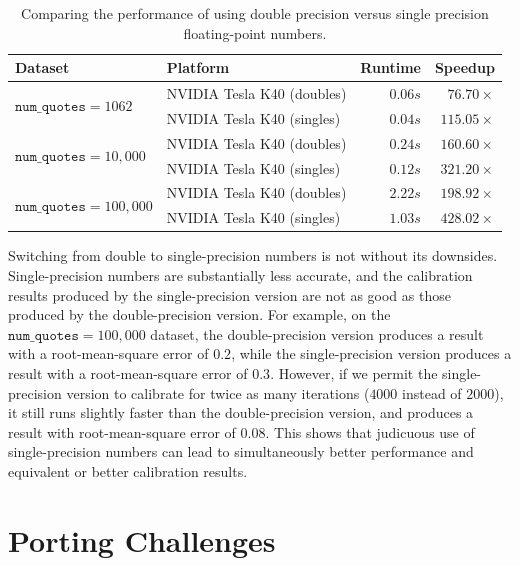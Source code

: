 \documentclass{article}
\begin{document}
\begin{table}
  \centering
\begin{tabular}{l|l|r|r}
  \textbf{Dataset} & \textbf{Platform} & \textbf{Runtime} & \textbf{Speedup} \\\hline\hline

  \multirow{2}{*}{$\texttt{num\_quotes}=1062$} & NVIDIA Tesla K40 (doubles) & $0.06s$ & $76.70\times$ \\
  & NVIDIA Tesla K40 (singles) & $0.04s$ & $115.05\times$ \\\hline

  \multirow{2}{*}{$\texttt{num\_quotes}=10,000$} & NVIDIA Tesla K40 (doubles) & $0.24s$ & $160.60\times$  \\
  & NVIDIA Tesla K40 (singles) & $0.12s$ & $321.20\times$ \\\hline

  \multirow{2}{*}{$\texttt{num\_quotes}=100,000$} & NVIDIA Tesla K40 (doubles) & $2.22s$ & $198.92\times$ \\
  & NVIDIA Tesla K40 (singles) & $1.03s$ & $428.02\times$ \\
\end{tabular}
\caption{Comparing the performance of using double precision versus
  single precision floating-point numbers.}
  \label{tab:single-precision}
\end{table}

Switching from double to single-precision numbers is not without its
downsides.  Single-precision numbers are substantially less accurate,
and the calibration results produced by the single-precision version
are not as good as those produced by the double-precision version.
For example, on the $\texttt{num\_quotes}=100,000$ dataset, the
double-precision version produces a result with a root-mean-square
error of $0.2$, while the single-precision version produces a result
with a root-mean-square error of $0.3$.  However, if we permit the
single-precision version to calibrate for twice as many iterations
($4000$ instead of $2000$), it still runs slightly faster than the
double-precision version, and produces a result with root-mean-square
error of $0.08$.  This shows that judicuous use of single-precision
numbers can lead to simultaneously better performance and equivalent
or better calibration results.

\section{Porting Challenges}
\end{document}

